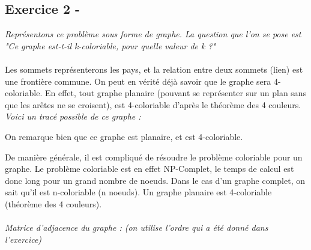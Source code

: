 \documentclass{article}
\begin{document}
\subsection*{Exercice 2 -}
\textit{Représentons ce problème sous forme de graphe. La question que l'on se pose est "Ce graphe est-t-il k-coloriable, pour quelle valeur de k ?"}\\\\
\linebreak
\textsf{Les sommets représenterons les pays, et la relation entre deux sommets (lien) est une frontière commune.}
\textsf{On peut en vérité déjà savoir que le graphe sera 4-coloriable. En effet, tout graphe planaire (pouvant se représenter sur un plan sans que les arêtes ne se croisent), est 4-coloriable d'après le théorème des 4 couleurs.}\\
\linebreak
\textit{Voici un tracé possible de ce graphe :}
	\begin{center}
		\textsf{On remarque bien que ce graphe est planaire, et est 4-coloriable.}
	\end{center}
\textsf{De manière générale, il est compliqué de résoudre le problème coloriable pour un graphe.}
\textsf{Le problème coloriable est en effet NP-Complet, le temps de calcul est donc long pour un grand nombre de noeuds.}
\textsf{Dans le cas d'un graphe complet, on sait qu'il est n-coloriable (n noeuds).}
\textsf{Un graphe planaire est 4-coloriable (théorème des 4 couleurs).}\\\\
\textit{Matrice d'adjacence du graphe : (on utilise l'ordre qui a été donné dans l'exercice)}
\end{document}
